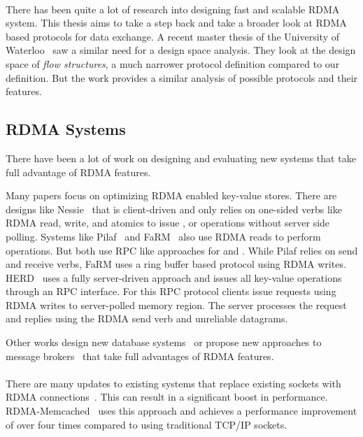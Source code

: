 \paragraph{} There has been quite a lot of research into designing fast and scalable RDMA system. This thesis aims to take
a step back and take a broader look at RDMA based protocols for data exchange. A recent master thesis of the University of 
Waterloo~\cite{sharma2020design} saw a similar need for a design space analysis. They look at the design space of \emph{flow structures},
a much narrower protocol definition compared to our definition. But the work provides a similar analysis of possible
protocols and their features.


\subsection{RDMA Systems}

There have been a lot of work on designing and evaluating new systems that take full advantage of RDMA features.

Many papers focus on optimizing RDMA enabled key-value stores. There are designs like Nessie~\cite{nessie} that is 
client-driven and only relies on one-sided verbs like RDMA read, write, and atomics to issue , 
or  operations without server side polling.
Systems like Pilaf~\cite{pilaf} and FaRM~\cite{farm} also use RDMA reads to perform  operations. But both use 
RPC like approaches for  and . While Pilaf relies on send and receive verbs, FaRM uses a ring buffer
based protocol using RDMA writes.
HERD~\cite{herd} uses a fully server-driven approach and issues all key-value operations through an RPC interface. For this
RPC protocol clients issue requests using RDMA writes to server-polled memory region. The server processes the request and
replies using the RDMA send verb and unreliable datagrams.

Other works design new database systems~\cite{dbrackjoin} or propose new approaches to message brokers~\cite{broker}
that take full advantages of RDMA features. 

\paragraph{} There are many updates to existing systems that replace existing sockets with RDMA 
connections~\cite{memcached, hbase, hdfs}. This can result in a significant boost in performance. RDMA-Memcached~\cite{memcached} 
uses this approach and achieves a performance improvement of over four times compared to using traditional TCP/IP sockets.

